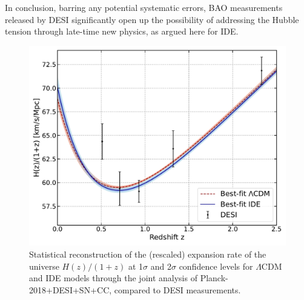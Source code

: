 \documentclass[superscriptaddress,twocolumn,showpacs,a4paper,
amssymb,amsmath,nobibnotes,aps,prl,
showkeys,
nofootinbib,notitlepage]{revtex4-1}
\begin{document}
In conclusion, barring any potential systematic errors, BAO measurements released by DESI significantly open up the possibility of addressing the Hubble tension through late-time new physics, as argued here for IDE.

\begin{figure}[tpb!]
    \centering
    \includegraphics[width=\columnwidth]{Figure3.pdf} 
    \caption{Statistical reconstruction of the (rescaled) expansion rate of the universe $H(z)/(1+z)$ at 1$\sigma$ and 2$\sigma$ confidence levels for $\Lambda$CDM and IDE models through the joint analysis of Planck-2018+DESI+SN+CC, compared to DESI measurements.}
    \label{fig:H(z)}
\end{figure}
\end{document}
